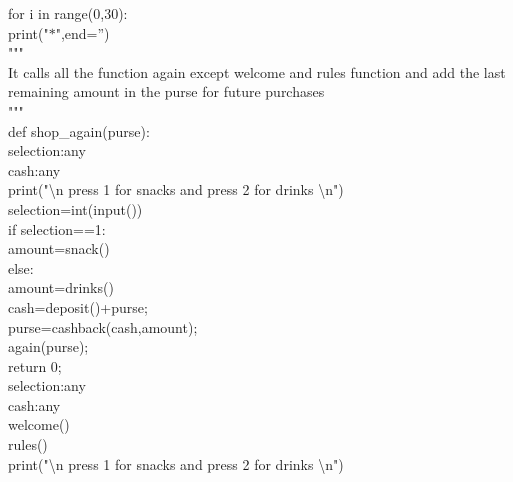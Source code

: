 \documentclass[10pt,a4paper]{article}
\begin{document}
\begin{flushleft}
\hspace*{0.5cm}\hspace*{0.5cm}        for i in range(0,30):\\
\hspace*{0.5cm}\hspace*{0.5cm}\hspace*{0.5cm}            print("$\ast$",end='')\\
\bigskip
"""\\
It calls all the function again except welcome and rules function and add the last remaining amount in 
the purse for future purchases\\
"""\\
def shop\_again(purse):\\
\hspace*{0.5cm}    selection:any\\
\hspace*{0.5cm}    cash:any\\
\hspace*{0.5cm}    print("\textbackslash n press 1 for snacks and press 2 for drinks \textbackslash n")\\
\hspace*{0.5cm}    selection=int(input())\\
\hspace*{0.5cm}    if selection==1:\\
\hspace*{0.5cm}\hspace*{0.5cm}        amount=snack()\\
\hspace*{0.5cm}    else:\\
\hspace*{0.5cm}\hspace*{0.5cm}        amount=drinks()\\
\hspace*{0.5cm}    cash=deposit()+purse;\\
\hspace*{0.5cm}    purse=cashback(cash,amount);\\
 \hspace*{0.5cm}   again(purse);\\
\hspace*{0.5cm}    return 0;\\
\bigskip
selection:any\\
cash:any\\
welcome()\\
rules()\\
print("\textbackslash n press 1 for snacks and press 2 for drinks \textbackslash n")\\

\end{flushleft}
\end{document}
